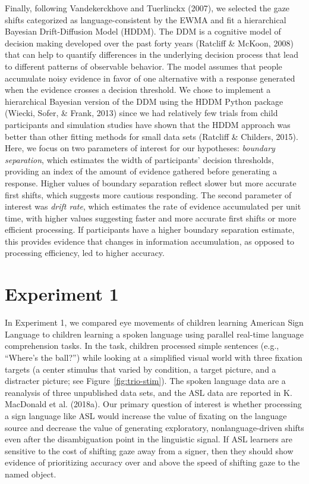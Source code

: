 \documentclass[,man,floatsintext]{apa6}
\begin{document}
Finally, following Vandekerckhove and Tuerlinckx (2007), we selected the gaze shifts categorized as language-consistent by the EWMA and fit a hierarchical Bayesian Drift-Diffusion Model (HDDM). The DDM is a cognitive model of decision making developed over the past forty years (Ratcliff \& McKoon, 2008) that can help to quantify differences in the underlying decision process that lead to different patterns of observable behavior. The model assumes that people accumulate noisy evidence in favor of one alternative with a response generated when the evidence crosses a decision threshold. We chose to implement a hierarchical Bayesian version of the DDM using the HDDM Python package (Wiecki, Sofer, \& Frank, 2013) since we had relatively few trials from child participants and simulation studies have shown that the HDDM approach was better than other fitting methods for small data sets (Ratcliff \& Childers, 2015). Here, we focus on two parameters of interest for our hypotheses: \emph{boundary separation}, which estimates the width of participants' decision thresholds, providing an index of the amount of evidence gathered before generating a response. Higher values of boundary separation reflect slower but more accurate first shifts, which suggests more cautious responding. The second parameter of interest was \emph{drift rate}, which estimates the rate of evidence accumulated per unit time, with higher values suggesting faster and more accurate first shifts or more efficient processing. If participants have a higher boundary separation estimate, this provides evidence that changes in information accumulation, as opposed to processing efficiency, led to higher accuracy.

\hypertarget{experiment-1}{%
\section{Experiment 1}\label{experiment-1}}

In Experiment 1, we compared eye movements of children learning American Sign Language to children learning a spoken language using parallel real-time language comprehension tasks. In the task, children processed simple sentences (e.g., \enquote{Where's the ball?}) while looking at a simplified visual world with three fixation targets (a center stimulus that varied by condition, a target picture, and a distracter picture; see Figure~\ref{fig:trio-stim}). The spoken language data are a reanalysis of three unpublished data sets, and the ASL data are reported in K. MacDonald et al. (2018a). Our primary question of interest is whether processing a sign language like ASL would increase the value of fixating on the language source and decrease the value of generating exploratory, nonlanguage-driven shifts even after the disambiguation point in the linguistic signal. If ASL learners are sensitive to the cost of shifting gaze away from a signer, then they should show evidence of prioritizing accuracy over and above the speed of shifting gaze to the named object.
\end{document}
